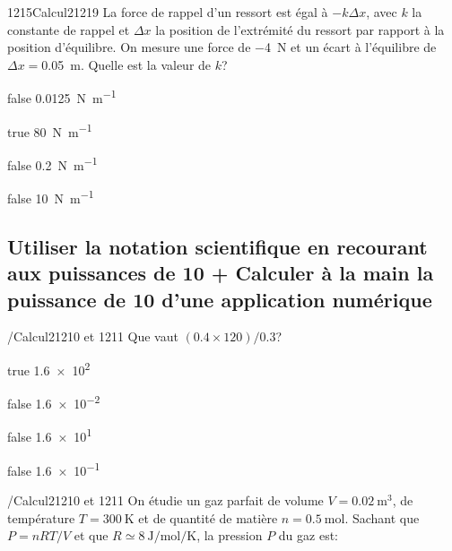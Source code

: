 \documentclass[11pt]{article}
\begin{document}
            \begin{question}{1215}{Calcul}{2}{1219}
                La force de rappel d'un ressort est égal à $-k\Delta x$, avec $k$ la constante de rappel et $\Delta x$ la position de l'extrémité du ressort par rapport à la position d'équilibre. On mesure une force de \SI{-4}{\newton} et un écart à l'équilibre de $\Delta x=$\SI{0,05}{\meter}. Quelle est la valeur de $k$?
            \end{question}

            \begin{reponses}
                \item[false] \SI{0,0125}{\newton\per\meter}
                \item[true] \SI{80}{\newton\per\meter}
                \item[false] \SI{0,2}{\newton\per\meter}
                \item[false] \SI{10}{\newton\per\meter}
            \end{reponses}
        
        \subsection{Utiliser la notation scientifique en recourant aux puissances de 10 + Calculer à la main la puissance de 10 d'une application numérique}

            \begin{question}{/}{Calcul}{2}{1210 et 1211}
                Que vaut $(\num{0.4} \times 120)/\num{0.3}$?
            \end{question}

            \begin{reponses}
                \item[true] \num{1.6e2}
                \item[false] \num{1.6e-2}
                \item[false] \num{1.6e1}
                \item[false] \num{1.6e-1}
            \end{reponses}

            \begin{question}{/}{Calcul}{2}{1210 et 1211}
                On étudie un gaz parfait de volume $V=\SI{0.02}{\meter\cubed}$, de température $T=\SI{300}{\kelvin}$ et de quantité de matière $n=\SI{0.5}{\mole}$. Sachant que $P=nRT/V$ et que $R\simeq\SI{8}{\joule\per\mole\per\kelvin}$, la pression $P$ du gaz est:
            \end{question}
\end{document}
